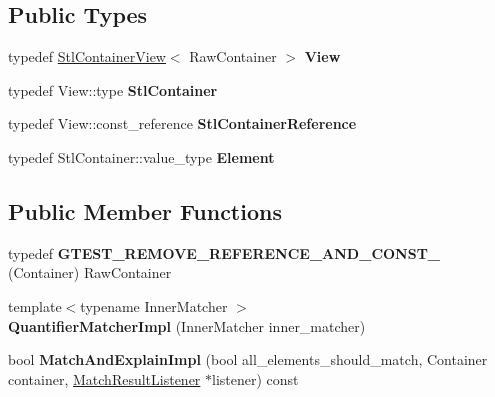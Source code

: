 \subsection*{Public Types}
\begin{DoxyCompactItemize}
\item 
\mbox{\label{classtesting_1_1internal_1_1_quantifier_matcher_impl_aa1e6b1653b6fdee1b0cfc4c58a9059e6}} 
typedef \hyperlink{classtesting_1_1internal_1_1_stl_container_view}{Stl\+Container\+View}$<$ Raw\+Container $>$ {\bfseries View}
\item 
\mbox{\label{classtesting_1_1internal_1_1_quantifier_matcher_impl_a7faa9a49c627e6db66e0ff9cdc88b6fc}} 
typedef View\+::type {\bfseries Stl\+Container}
\item 
\mbox{\label{classtesting_1_1internal_1_1_quantifier_matcher_impl_a341dd7815b3c6090d935026daac6e938}} 
typedef View\+::const\+\_\+reference {\bfseries Stl\+Container\+Reference}
\item 
\mbox{\label{classtesting_1_1internal_1_1_quantifier_matcher_impl_a6f73e2e5fa853f8b5fdd33d6a1811f9e}} 
typedef Stl\+Container\+::value\+\_\+type {\bfseries Element}
\end{DoxyCompactItemize}
\subsection*{Public Member Functions}
\begin{DoxyCompactItemize}
\item 
\mbox{\label{classtesting_1_1internal_1_1_quantifier_matcher_impl_aa3648a9fce92090dc3987eb10faf16e1}} 
typedef {\bfseries G\+T\+E\+S\+T\+\_\+\+R\+E\+M\+O\+V\+E\+\_\+\+R\+E\+F\+E\+R\+E\+N\+C\+E\+\_\+\+A\+N\+D\+\_\+\+C\+O\+N\+S\+T\+\_\+} (Container) Raw\+Container
\item 
\mbox{\label{classtesting_1_1internal_1_1_quantifier_matcher_impl_aef125c9971ea1d02d138cd8fd2af0287}} 
{\footnotesize template$<$typename Inner\+Matcher $>$ }\\{\bfseries Quantifier\+Matcher\+Impl} (Inner\+Matcher inner\+\_\+matcher)
\item 
\mbox{\label{classtesting_1_1internal_1_1_quantifier_matcher_impl_ab8f64532b70f47fc60f7983ebe5cbfc6}} 
bool {\bfseries Match\+And\+Explain\+Impl} (bool all\+\_\+elements\+\_\+should\+\_\+match, Container container, \hyperlink{classtesting_1_1_match_result_listener}{Match\+Result\+Listener} $\ast$listener) const
\end{DoxyCompactItemize}
